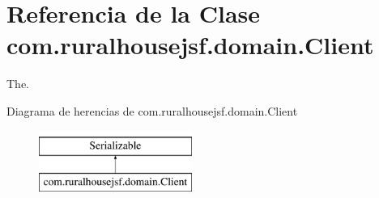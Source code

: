 \hypertarget{a00164}{}\section{Referencia de la Clase com.\+ruralhousejsf.\+domain.\+Client}
\label{a00164}


The.  


Diagrama de herencias de com.\+ruralhousejsf.\+domain.\+Client\begin{figure}[H]
\begin{center}
\leavevmode
\includegraphics[height=2.000000cm]{a00164}
\end{center}
\end{figure}

